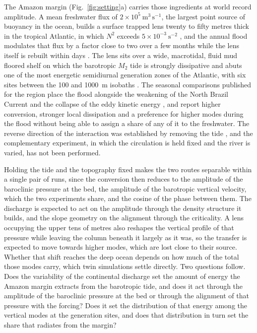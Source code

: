 \documentclass[a4paper,fleqn]{cas-sc}
\begin{document}
The Amazon margin (Fig.~\ref{fig:setting}a) carries those ingredients at world record amplitude. A mean freshwater flux of $2\times10^{5}\ \mathrm{m^{3}\,s^{-1}}$, the largest point source of buoyancy in the ocean, builds a surface trapped lens twenty to fifty metres thick in the tropical Atlantic, in which $N^{2}$ exceeds $5\times10^{-3}\ \mathrm{s^{-2}}$ \citep{lentz1995seasonal,geyer1996physical,prestes2018amazon,nascimento:2026}, and the annual flood modulates that flux by a factor close to two over a few months while the lens itself is rebuilt within days \citep{hiban1996,hornerdevine:2015}. The lens sits over a wide, macrotidal, fluid mud floored shelf on which the barotropic $M_{2}$ tide is strongly dissipative \citep{beardsley:1995,gabioux:2005,kineke1996fluid,fontes:2008} and abuts one of the most energetic semidiurnal generation zones of the Atlantic, with six sites between the 100 and 1000~m isobaths \citep{magalhaes:2016,lentini:2016,bai:2021,tchilibou:2022,barbot_2021,assene:2024,kouogang:2025}. The seasonal comparisons published for the region place the flood alongside the weakening of the North Brazil Current and the collapse of the eddy kinetic energy \citep{tchilibou:2022,barbot_2021,assene:2024}, and report higher conversion, stronger local dissipation and a preference for higher modes during the flood without being able to assign a share of any of it to the freshwater. The reverse direction of the interaction was established by removing the tide \citep{ruault2020role,assene:2024}, and the complementary experiment, in which the circulation is held fixed and the river is varied, has not been performed.

Holding the tide and the topography fixed makes the two routes separable within a single pair of runs, since the conversion then reduces to the amplitude of the baroclinic pressure at the bed, the amplitude of the barotropic vertical velocity, which the two experiments share, and the cosine of the phase between them. The discharge is expected to act on the amplitude through the density structure it builds, and the slope geometry on the alignment through the criticality. A lens occupying the upper tens of metres also reshapes the vertical profile of that pressure while leaving the column beneath it largely as it was, so the transfer is expected to move towards higher modes, which are lost close to their source. Whether that shift reaches the deep ocean depends on how much of the total those modes carry, which twin simulations settle directly. Two questions follow. Does the variability of the continental discharge set the amount of energy the Amazon margin extracts from the barotropic tide, and does it act through the amplitude of the baroclinic pressure at the bed or through the alignment of that pressure with the forcing? Does it set the distribution of that energy among the vertical modes at the generation sites, and does that distribution in turn set the share that radiates from the margin?
\end{document}

